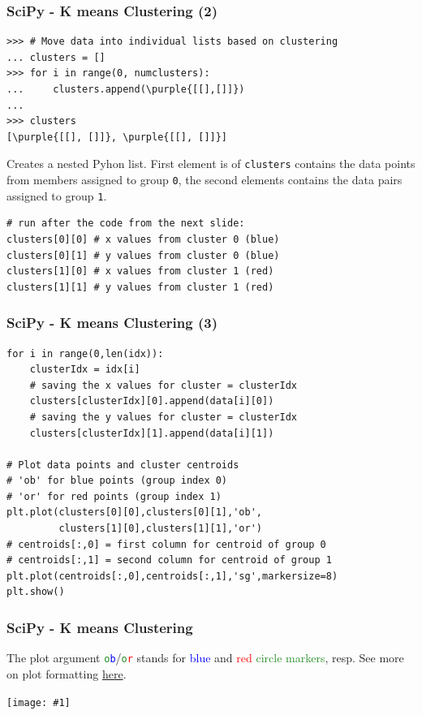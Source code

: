 \documentclass[xcolor=svgnames, handout]{beamer}
\newcommand{\red}[1]{\textcolor{red}{#1}}
\newcommand{\green}[1]{\textcolor{ForestGreen}{#1}}
\newcommand{\blue}[1]{{\textcolor{blue}{#1}}}
\newcommand{\purple}[1]{{\textcolor{purple}{#1}}}
\newcommand{\ipic}[2]{\texttt{[image: \#1]}}
\newcommand{\ft}[1]{\frametitle{#1}}
\begin{document}
\begin{frame}[fragile]\ft{SciPy -  K means Clustering (2)}
\begin{Verbatim}[xleftmargin=.1in, frame=single, commandchars=\\\{\}]
>>> # Move data into individual lists based on clustering
... clusters = []
>>> for i in range(0, numclusters):
...     clusters.append(\purple{[[],[]]})
... 
>>> clusters
[\purple{[[], []]}, \purple{[[], []]}]
\end{Verbatim}
Creates a nested Pyhon list.  First element is of {\tt clusters} contains the data points from members assigned to group {\tt 0}, the second elements contains the data pairs assigned to group {\tt 1}.  
\begin{Verbatim}[xleftmargin=.1in, frame=single]
# run after the code from the next slide:
clusters[0][0] # x values from cluster 0 (blue)
clusters[0][1] # y values from cluster 0 (blue)
clusters[1][0] # x values from cluster 1 (red)
clusters[1][1] # y values from cluster 1 (red)
\end{Verbatim}

\end{frame}


\begin{frame}[fragile]\ft{SciPy -  K means Clustering (3)}
\begin{Verbatim}[xleftmargin=.1in] 
for i in range(0,len(idx)):
    clusterIdx = idx[i]
    # saving the x values for cluster = clusterIdx
    clusters[clusterIdx][0].append(data[i][0])
    # saving the y values for cluster = clusterIdx
    clusters[clusterIdx][1].append(data[i][1])    

# Plot data points and cluster centroids
# 'ob' for blue points (group index 0)
# 'or' for red points (group index 1)
plt.plot(clusters[0][0],clusters[0][1],'ob',
    	 clusters[1][0],clusters[1][1],'or')
# centroids[:,0] = first column for centroid of group 0
# centroids[:,1] = second column for centroid of group 1
plt.plot(centroids[:,0],centroids[:,1],'sg',markersize=8)
plt.show()
\end{Verbatim}
\end{frame}


\begin{frame}\ft{SciPy - K means Clustering}
The plot argument {\tt \green{o}\blue b}/{\tt \green{o}\red r} stands for \blue{blue} and \red{red} \green{circle markers}, resp. See more on plot formatting \href{https://www.python-course.eu/matplotlib.php}{here}.
\begin{center}
\ipic{kmeans}{0.8}
\end{center}

\end{frame}
\end{document}

